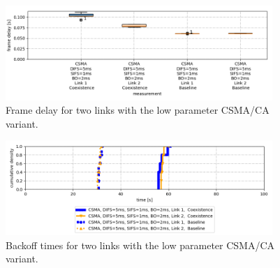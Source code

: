 \begin{figure}[tb]
	\label{fig:results-csma-low-dbl-frame-delay}
	\begin{center}
		\includegraphics[width=0.9\textwidth]{pictures/results/same_combinations/csma_low_params/frame_delay_boxplot}
	\end{center}
	\caption{Frame delay for two links with the low parameter CSMA/CA variant.}
\end{figure}

\begin{figure}[bt]
	\label{fig:results-csma-low-dbl-backoff}
	\begin{center}
		\includegraphics[width=0.9\textwidth]{pictures/results/same_combinations/csma_low_params/backoff_(joint)_sum_cdf}
	\end{center}
	\caption{Backoff times for two links with the low parameter CSMA/CA variant.}
\end{figure}


